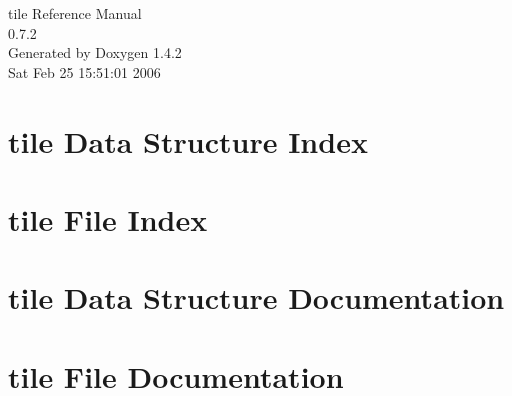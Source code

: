 \documentclass[a4paper]{book}
\begin{document}
\begin{titlepage}
\vspace*{7cm}
\begin{center}
{\Large tile Reference Manual\\[1ex]\large 0.7.2 }\\
\vspace*{1cm}
{\large Generated by Doxygen 1.4.2}\\
\vspace*{0.5cm}
{\small Sat Feb 25 15:51:01 2006}\\
\end{center}
\end{titlepage}
\clearemptydoublepage
{}
\tableofcontents
\clearemptydoublepage
{}
\chapter{tile Data Structure Index}

\chapter{tile File Index}

\chapter{tile Data Structure Documentation}


\chapter{tile File Documentation}










\printindex
\end{document}
